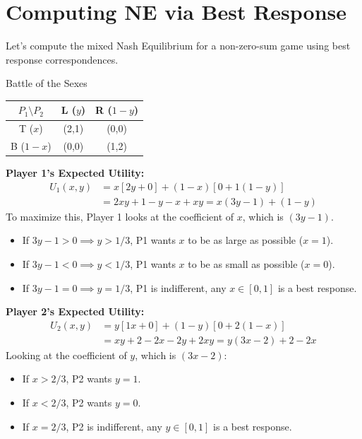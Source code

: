 \documentclass[12pt, a4paper]{article}
\begin{document}
\section{Computing NE via Best Response}

Let's compute the mixed Nash Equilibrium for a non-zero-sum game using best response correspondences.

\begin{exbox}{Battle of the Sexes}
  \begin{center}
  \renewcommand{\arraystretch}{1.3}
  \begin{tabular}{c|cc}
    $P_1 \setminus P_2$ & L ($y$) & R ($1-y$) \\
    \hline
    T ($x$) & (2,1) & (0,0) \\
    B ($1-x$) & (0,0) & (1,2) \\
  \end{tabular}
  \end{center}
\end{exbox}

\textbf{Player 1's Expected Utility:}
\begin{align*}
  U_1(x, y) &= x[2y + 0] + (1-x)[0 + 1(1-y)] \\
  &= 2xy + 1 - y - x + xy = x(3y - 1) + (1-y)
\end{align*}
To maximize this, Player 1 looks at the coefficient of $x$, which is $(3y - 1)$.
\begin{itemize}
    \item If $3y - 1 > 0 \implies y > 1/3$, P1 wants $x$ to be as large as possible ($x=1$).
    \item If $3y - 1 < 0 \implies y < 1/3$, P1 wants $x$ to be as small as possible ($x=0$).
    \item If $3y - 1 = 0 \implies y = 1/3$, P1 is indifferent, any $x \in [0,1]$ is a best response.
\end{itemize}

\textbf{Player 2's Expected Utility:}
\begin{align*}
  U_2(x, y) &= y[1x + 0] + (1-y)[0 + 2(1-x)] \\
  &= xy + 2 - 2x - 2y + 2xy = y(3x - 2) + 2 - 2x
\end{align*}
Looking at the coefficient of $y$, which is $(3x - 2)$:
\begin{itemize}
    \item If $x > 2/3$, P2 wants $y=1$.
    \item If $x < 2/3$, P2 wants $y=0$.
    \item If $x = 2/3$, P2 is indifferent, any $y \in [0,1]$ is a best response.
\end{itemize}
\end{document}
